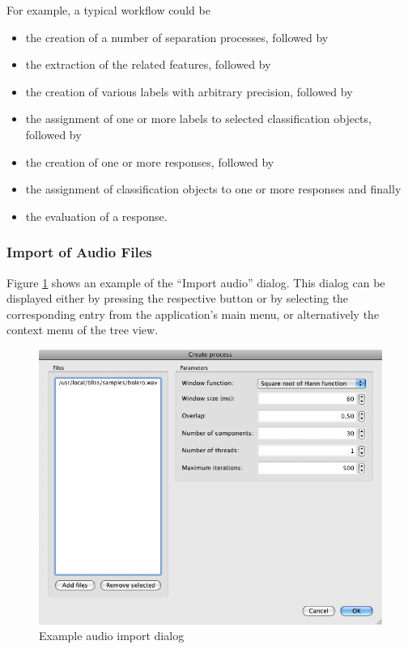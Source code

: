 For example, a typical workflow could be
\begin{itemize}
  \item   the creation of a number of separation processes, followed by
  \item   the extraction of the related features, followed by
  \item   the creation of various labels with arbitrary precision, followed by
  \item   the assignment of one or more labels to selected classification
    objects, followed by
  \item   the creation of one or more responses, followed by
  \item   the assignment of classification objects to one or more responses
    and finally
  \item   the evaluation of a response.
\end{itemize}


\subsubsection{Import of Audio Files}

Figure \ref{figure:ProcessCreation} shows an example of the ``Import audio''
dialog. This dialog can be displayed either by pressing the respective button or
by selecting the corresponding entry from the application's main menu, or
alternatively the context menu of the tree view.

\begin{figure}
    \includegraphics[width=\textwidth]{images/ProcessCreation.png}
    \caption{%
        \label{figure:ProcessCreation}%
        Example audio import dialog
    }
\end{figure}


